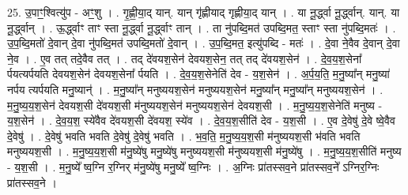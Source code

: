 \documentclass[17pt]{extarticle}
\begin{document}
25. उ॒पाꣳ॒॒श्वित्यु॑प - अꣳ॒॒शु । . गृ॒ह्णी॒या॒द् यान्. यान् गृ॑ह्णीयाद् गृह्णीया॒द् यान् । . या नू॒र्द्ध्वा नू॒र्द्ध्वान्. यान्. या नू॒र्द्ध्वान् । . ऊ॒र्द्ध्वाꣳ ताꣳ स्ता नू॒र्द्ध्वा नू॒र्द्ध्वाꣳ तान् । . ता नु॑पब्दि॒मत॑ उपब्दि॒मत॒ स्ताꣳ स्ता नु॑पब्दि॒मतः॑ । . उ॒प॒ब्दि॒मतो॑ दे॒वान् दे॒वा नु॑पब्दि॒मत॑ उपब्दि॒मतो॑ दे॒वान् । . उ॒प॒ब्दि॒मत॒ इत्यु॑पब्दि - मतः॑ । . दे॒वा ने॒वैव दे॒वान् दे॒वा ने॒व । . ए॒व तत् तदे॒वैव तत् । . तद् दे॑वयश॒सेन॑ देवयश॒सेन॒ तत् तद् दे॑वयश॒सेन॑ । . दे॒व॒य॒श॒सेना᳚ र्पयत्यर्पयति देवयश॒सेन॑ देवयश॒सेना᳚ र्पयति । . दे॒व॒य॒श॒सेनेति॑ देव - य॒श॒सेन॑ । . अ॒र्प॒य॒ति॒ म॒नु॒ष्या᳚न् मनु॒ष्या॑ नर्पय त्यर्पयति मनु॒ष्यान्॑ । . म॒नु॒ष्या᳚न् मनुष्ययश॒सेन॑ मनुष्ययश॒सेन॑ मनु॒ष्या᳚न् मनु॒ष्या᳚न् मनुष्ययश॒सेन॑ । . म॒नु॒ष्य॒य॒श॒सेन॑ देवयश॒सी दे॑वयश॒सी म॑नुष्ययश॒सेन॑ मनुष्ययश॒सेन॑ देवयश॒सी । . म॒नु॒ष्य॒य॒श॒सेनेति॑ मनुष्य - य॒श॒सेन॑ । . दे॒व॒य॒श॒ स्ये॑वैव दे॑वयश॒सी दे॑वयश॒ स्ये॑व । . दे॒व॒य॒श॒सीति॑ देव - य॒श॒सी । . ए॒व दे॒वेषु॑ दे॒वे ष्वे॒वैव दे॒वेषु॑ । . दे॒वेषु॑ भवति भवति दे॒वेषु॑ दे॒वेषु॑ भवति । . भ॒व॒ति॒ म॒नु॒ष्य॒य॒श॒सी म॑नुष्ययश॒सी भ॑वति भवति मनुष्ययश॒सी । . म॒नु॒ष्य॒य॒श॒सी म॑नु॒ष्ये॑षु मनु॒ष्ये॑षु मनुष्ययश॒सी म॑नुष्ययश॒सी म॑नु॒ष्ये॑षु । . म॒नु॒ष्य॒य॒श॒सीति॑ मनुष्य - य॒श॒सी । . म॒नु॒ष्ये᳚ ष्व॒ग्नि र॒ग्निर् म॑नु॒ष्ये॑षु मनु॒ष्ये᳚ ष्व॒ग्निः । . अ॒ग्निः प्रा॑तस्सव॒ने प्रा॑तस्सव॒ने᳚ ऽग्निर॒ग्निः प्रा॑तस्सव॒ने । \newline
\end{document}
